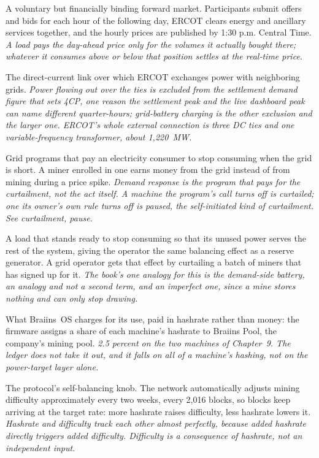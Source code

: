 \begin{description}[leftmargin=0pt,style=unboxed,itemsep=0.35em,parsep=0.15em]
\item[Day-Ahead Market (DAM)] \hypertarget{glossary:day-ahead-market}{}A voluntary but financially binding forward market. Participants submit offers and bids for each hour of the following day, ERCOT clears energy and ancillary services together, and the hourly prices are published by 1:30 p.m. Central Time. \emph{A load pays the day-ahead price only for the volumes it actually bought there; whatever it consumes above or below that position settles at the real-time price.}
\item[DC tie] \hypertarget{glossary:dc-tie}{}The direct-current link over which ERCOT exchanges power with neighboring grids. \emph{Power flowing out over the ties is excluded from the settlement demand figure that sets 4CP, one reason the settlement peak and the live dashboard peak can name different quarter-hours; grid-battery charging is the other exclusion and the larger one. ERCOT's whole external connection is three DC ties and one variable-frequency transformer, about 1,220~MW.}
\item[demand response] \hypertarget{glossary:demand-response}{}Grid programs that pay an electricity consumer to stop consuming when the grid is short. A miner enrolled in one earns money from the grid instead of from mining during a price spike. \emph{Demand response is the program that pays for the curtailment, not the act itself. A machine the program's call turns off is curtailed; one its owner's own rule turns off is paused, the self-initiated kind of curtailment. See curtailment, pause.}
\item[demand-side reserve] \hypertarget{glossary:demand-side-reserve}{}A load that stands ready to stop consuming so that its unused power serves the rest of the system, giving the operator the same balancing effect as a reserve generator. A grid operator gets that effect by curtailing a batch of miners that has signed up for it. \emph{The book's one analogy for this is the demand-side battery, an analogy and not a second term, and an imperfect one, since a mine stores nothing and can only stop drawing.}
\item[development fee (devfee)] \hypertarget{glossary:development-fee}{}What Braiins~OS charges for its use, paid in hashrate rather than money: the firmware assigns a share of each machine's hashrate to Braiins Pool, the company's mining pool. \emph{2.5 percent on the two machines of Chapter~9. The ledger does not take it out, and it falls on all of a machine's hashing, not on the power-target layer alone.}
\item[difficulty] \hypertarget{glossary:difficulty}{}The protocol's self-balancing knob. The network automatically adjusts mining difficulty approximately every two weeks, every 2,016 blocks, so blocks keep arriving at the target rate: more hashrate raises difficulty, less hashrate lowers it. \emph{Hashrate and difficulty track each other almost perfectly, because added hashrate directly triggers added difficulty. Difficulty is a consequence of hashrate, not an independent input.}

\end{description}
